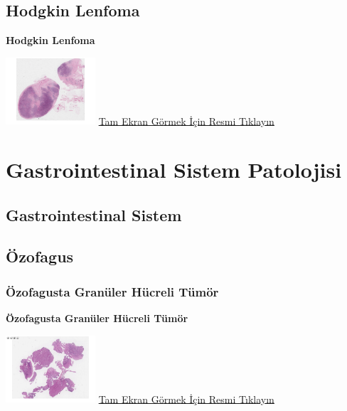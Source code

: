 \documentclass[
  letterpaper,
  DIV=11,
  numbers=noendperiod]{scrreprt}
\begin{document}
\hypertarget{sec-hodgkin-lenfoma}{%
\chapter{Hodgkin Lenfoma}\label{sec-hodgkin-lenfoma}}

\textbf{Hodgkin Lenfoma}

\href{https://images.patolojiatlasi.com/hodgkin/HE.html}{\includegraphics[width=0.25\textwidth,height=\textheight]{./screenshots/thumbnail_hodgkin.png}}
\href{https://images.patolojiatlasi.com/hodgkin/HE.html}{Tam Ekran
Görmek İçin Resmi Tıklayın}

\part{Gastrointestinal Sistem Patolojisi}

\hypertarget{sec-gastrointestinal-sistem}{%
\chapter{Gastrointestinal Sistem}\label{sec-gastrointestinal-sistem}}

\hypertarget{sec-ozofagus}{%
\chapter{Özofagus}\label{sec-ozofagus}}

\hypertarget{sec-ozofagus-granuler-hucreli-tumor}{%
\section{Özofagusta Granüler Hücreli
Tümör}\label{sec-ozofagus-granuler-hucreli-tumor}}

\textbf{Özofagusta Granüler Hücreli Tümör}

\href{https://images.patolojiatlasi.com/granular-cell-tumor/HE.html}{\includegraphics[width=0.25\textwidth,height=\textheight]{./screenshots/thumbnail_granular-cell-tumor.png}}
\href{https://images.patolojiatlasi.com/granular-cell-tumor/HE.html}{Tam
Ekran Görmek İçin Resmi Tıklayın}
\end{document}
